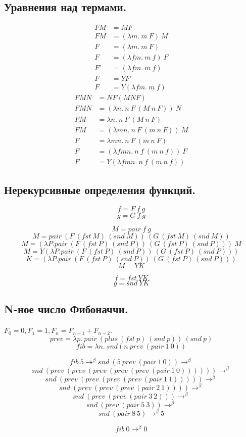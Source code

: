 \documentclass[a4paper,12pt]{article}
\theoremstyle{plain} %
\theoremstyle{definition} %
\theoremstyle{remark} %
\begin{document}
\subsection{Уравнения над термами.}
\begin{align*} 
FM &= MF \\
FM &= (\lambda m. \ m \ F) \ M \\ 
F  &= (\lambda m. \ m \ F) \\ 
F  &= (\lambda fm. \ m \ f) \ F \\
F' &= (\lambda fm. \ m \ f) \\
F  &= YF' \\
F  &= Y(\lambda f m. \ m \ f) 
\end{align*}
\begin{align*} 
FMN &= NF(MNF) \\
FMN &= (\lambda n. \ n \ F \ (M \ n \ F)) \ N \\
FM  &= \lambda n. \ n \ F \ (M \ n \ F) \\
FM  &= (\lambda m n. \ n \ F \ (m \ n \ F)) \ M \\
F   &= \lambda m n. \ n \ F \ (m \ n \ F) \\
F   &= (\lambda f m n. \ n \ f \ (m \ n \ f)) \ F \\
F   &= Y(\lambda f m n. \ n \ f \ (m \ n \ f)) 
\end{align*}
\subsection{Нерекурсивные определения функций.}
$$f = F \ f \ g$$
$$g = G \ f \ g$$

$$M = pair \ f \ g$$
$$M = pair \ (F \ (fst \ M) \ (snd \ M)) \ (G \ (fst \ M) \ (snd \ M))$$
$$M = (\lambda P. pair \ (F \ (fst \ P) \ (snd \ P)) \ (G \ (fst \ P) \ (snd \ P))) \ M$$
$$M = Y(\lambda P. pair \ (F \ (fst \ P) \ (snd \ P)) \ (G \ (fst \ P) \ (snd \ P)))$$
$$K = (\lambda P. pair \ (F \ (fst \ P) \ (snd \ P)) \ (G \ (fst \ P) \ (snd \ P)))$$
$$M = YK$$

$$f = fst \ YK$$
$$g = snd \ YK$$


\subsection{N-ное число Фибоначчи.}
$F_0 = 0, F_1 = 1, F_n = F_{n - 1} + F_{n - 2}$.
$$prev = \lambda p. \ pair \ (plus \ (fst \ p) \ (snd \ p)) \ (snd \ p)$$
$$fib = \lambda n. \ snd (n \ prev \ (pair \ 1 \ 0))$$

$$fib \ 5 \twoheadrightarrow^{\beta} snd \ (5 \ prev \ (pair \ 1 \ 0)) \rightarrow^{\beta}$$
$$snd \ (prev \ (prev \ (prev \ (prev \ (prev \  (pair \ 1 \ 0)))))) \rightarrow^{\beta}$$
$$snd \ (prev \ (prev \ (prev \ (prev \ (pair \ 1 \ 1))))) \rightarrow^{\beta}$$
$$snd \ (prev \ (prev \ (prev \ (pair \ 2 \ 1)))) \rightarrow^{\beta}$$
$$snd \ (prev \ (prev \ (pair \ 3 \ 2))) \rightarrow^{\beta}$$
$$snd \ (prev \ (pair \ 5 \ 3)) \rightarrow^{\beta}$$
$$snd \ (pair \ 8 \ 5) \rightarrow^{\beta} 5$$

$$fib \ 0 \rightarrow^{\beta} 0$$
\end{document}
